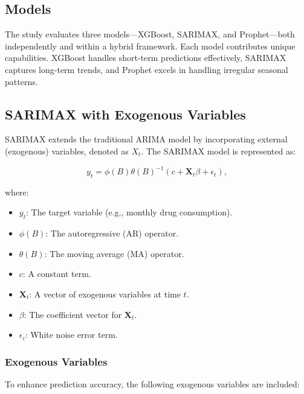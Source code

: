 \documentclass[journal]{IEEEtran}
\begin{document}
\subsection{Models}
The study evaluates three models—XGBoost, SARIMAX, and Prophet—both independently and within a hybrid framework. Each model contributes unique capabilities. XGBoost handles short-term predictions effectively, SARIMAX captures long-term trends, and Prophet excels in handling irregular seasonal patterns.

\subsection{SARIMAX with Exogenous Variables}
SARIMAX extends the traditional ARIMA model by incorporating external (exogenous) variables, denoted as \(X_{t}\). The SARIMAX model is represented as:

\begin{equation}
y_{t}=\phi(B)\theta(B)^{-1}\left(c+\mathbf{X}_{t}\beta+\epsilon_{t}\right),
\end{equation}

where:
\begin{itemize}
    \item \(y_{t}\): The target variable (e.g., monthly drug consumption).
    \item \(\phi(B)\): The autoregressive (AR) operator.
    \item \(\theta(B)\): The moving average (MA) operator.
    \item \(c\): A constant term.
    \item \(\mathbf{X}_{t}\): A vector of exogenous variables at time \(t\).
    \item \(\beta\): The coefficient vector for \(\mathbf{X}_{t}\).
    \item \(\epsilon_{i}\): White noise error term.
\end{itemize}

\subsubsection{Exogenous Variables}
To enhance prediction accuracy, the following exogenous variables are included:
\end{document}
